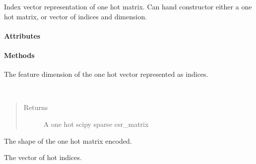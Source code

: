 \documentclass[letterpaper,10pt,english]{sphinxmanual}
\begin{document}
\begin{fulllineitems}
\label{loader:loader.HotIndex}
Index vector representation of one hot matrix. Can hand constructor either a one hot matrix, or vector of indices
and dimension.
\paragraph{Attributes}
\paragraph{Methods}

\begin{fulllineitems}
\label{loader:loader.HotIndex.dim}
The feature dimension of the one hot vector represented as indices.

\end{fulllineitems}


\begin{fulllineitems}
\label{loader:loader.HotIndex.hot}~\begin{quote}\begin{description}
\item[{Returns}] \leavevmode
A one hot scipy sparse csr\_matrix

\end{description}\end{quote}

\end{fulllineitems}


\begin{fulllineitems}
\label{loader:loader.HotIndex.shape}
The shape of the one hot matrix encoded.

\end{fulllineitems}


\begin{fulllineitems}
\label{loader:loader.HotIndex.vec}
The vector of hot indices.

\end{fulllineitems}


\end{fulllineitems}
\end{document}
